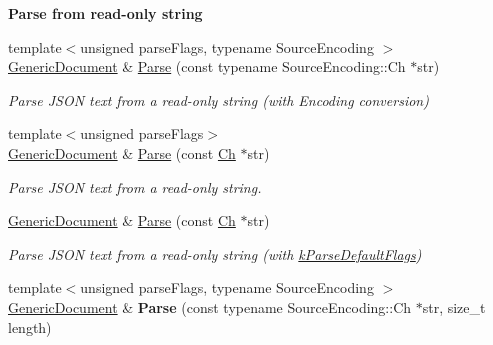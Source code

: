 \begin{Indent}\textbf{ Parse from read-\/only string}\par
\begin{DoxyCompactItemize}
\item 
{\footnotesize template$<$unsigned parse\+Flags, typename Source\+Encoding $>$ }\\\hyperlink{class_generic_document}{Generic\+Document} \& \hyperlink{class_generic_document_aadee36db7064cc9894a75c848831cdae}{Parse} (const typename Source\+Encoding\+::\+Ch $\ast$str)
\begin{DoxyCompactList}\small\item\em Parse J\+S\+ON text from a read-\/only string (with Encoding conversion) \end{DoxyCompactList}\item 
{\footnotesize template$<$unsigned parse\+Flags$>$ }\\\hyperlink{class_generic_document}{Generic\+Document} \& \hyperlink{class_generic_document_a5e377f840009b5cee6757be29525ce0b}{Parse} (const \hyperlink{class_generic_value_ade0e0ce64ccd5d852da57a35e720bafb}{Ch} $\ast$str)
\begin{DoxyCompactList}\small\item\em Parse J\+S\+ON text from a read-\/only string. \end{DoxyCompactList}\item 
\hyperlink{class_generic_document}{Generic\+Document} \& \hyperlink{class_generic_document_a49ae6de6fd0bc820d9864a106c10b4da}{Parse} (const \hyperlink{class_generic_value_ade0e0ce64ccd5d852da57a35e720bafb}{Ch} $\ast$str)
\begin{DoxyCompactList}\small\item\em Parse J\+S\+ON text from a read-\/only string (with \hyperlink{reader_8h_ab7be7dabe6ffcba60fad441505583450a9104b0946d648e9467cb7a967401ec80}{k\+Parse\+Default\+Flags}) \end{DoxyCompactList}\item 
\mbox{\label{class_generic_document_a46b5028cc760c4e915a0d5216af9f7e2}} 
{\footnotesize template$<$unsigned parse\+Flags, typename Source\+Encoding $>$ }\\\hyperlink{class_generic_document}{Generic\+Document} \& {\bfseries Parse} (const typename Source\+Encoding\+::\+Ch $\ast$str, size\+\_\+t length)
\item 
\mbox{\label{class_generic_document_a93fec16eacec4f4b42075bb3bc242a6b}} 

\end{DoxyCompactItemize}
\end{Indent}
